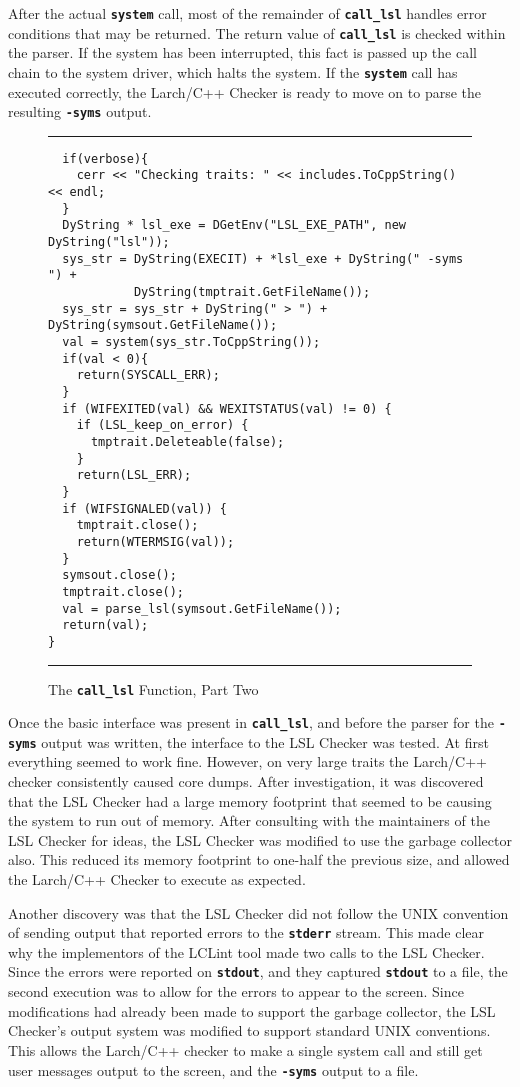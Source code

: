 \documentclass[12pt]{article} %
\newcommand{\reserved}[1]{\textbf{\texttt{#1}}} %
\newcommand{\UNSPACEFORBOX}{\vspace{-2ex}}
\newcommand{\HLINE}{\UNSPACEFORBOX%
\begin{flushleft}\rule{\textwidth}{0.01in}\end{flushleft}%
\UNSPACEFORBOX}
\newenvironment{BFIGURE}{

\begin{figure}
\small
\HLINE
}{
\HLINE
\normalsize
\end{figure}
}
\begin{document}
After the actual \reserved{system} call, most of the remainder of
\reserved{call\_lsl} handles error conditions that may be
returned. The return value of \reserved{call\_lsl} is checked within
the parser. If the system has been interrupted, this fact is passed up
the call chain to the system driver, which halts the system. If the
\reserved{system} call has executed correctly, the Larch/C++ Checker
is ready to move on to parse the resulting \reserved{-syms} output.

\begin{BFIGURE}
\begin{verbatim}
  if(verbose){
    cerr << "Checking traits: " << includes.ToCppString() << endl;
  }
  DyString * lsl_exe = DGetEnv("LSL_EXE_PATH", new DyString("lsl"));
  sys_str = DyString(EXECIT) + *lsl_exe + DyString(" -syms ") +
            DyString(tmptrait.GetFileName());
  sys_str = sys_str + DyString(" > ") + DyString(symsout.GetFileName());
  val = system(sys_str.ToCppString());
  if(val < 0){
    return(SYSCALL_ERR);
  }
  if (WIFEXITED(val) && WEXITSTATUS(val) != 0) {
    if (LSL_keep_on_error) {
      tmptrait.Deleteable(false);
    }
    return(LSL_ERR);
  }
  if (WIFSIGNALED(val)) {
    tmptrait.close();
    return(WTERMSIG(val));
  }
  symsout.close();
  tmptrait.close();
  val = parse_lsl(symsout.GetFileName());
  return(val);
}
\end{verbatim}
\caption{The \reserved{call\_lsl} Function, Part Two}
\label{calllsl2}
\end{BFIGURE}

Once the basic interface was present in \reserved{call\_lsl}, and
before the parser for the
\reserved{-syms} output was written, the
interface to the LSL Checker was tested. At first everything seemed to
work fine. However, on very large traits the Larch/C++ checker consistently
caused core dumps. After investigation, it was discovered that the LSL
Checker had a large memory footprint that seemed to be causing the
system to run out of memory. After consulting with the maintainers of
the LSL Checker for ideas, the LSL Checker was modified to use the
garbage collector also. This reduced its memory footprint to one-half
the previous size, and allowed the Larch/C++ Checker to execute as
expected. 

Another discovery was that the LSL Checker did not follow
the UNIX convention of sending output that reported errors to the
\reserved{stderr} stream. This made clear why the implementors of the
LCLint tool made two calls to the LSL Checker. Since the errors were
reported on \reserved{stdout}, and they captured \reserved{stdout} to
a file, the second execution was to allow for the errors to appear to
the screen. Since modifications had already been made to support the
garbage collector, the LSL Checker's output system was modified to
support standard UNIX conventions. This allows the Larch/C++ checker
to make a single system call and still get user messages output to
the screen, and the \reserved{-syms} output to a file.
\end{document}

